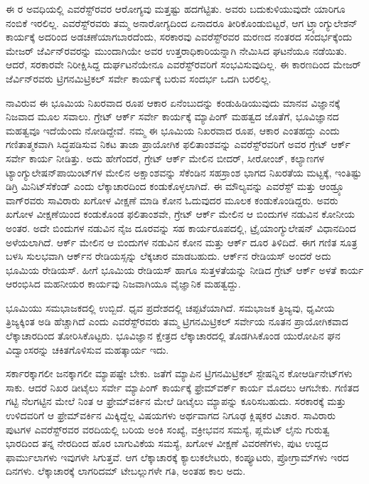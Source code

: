 ಈ ರ ಅವಧಿಯಲ್ಲಿ ಎವರೆಸ್ಟ್​ರವರ ಆರೋಗ್ಯವು ಮತ್ತಷ್ಟು ಹದಗೆಟ್ಟಿತು. ಅವರು ಬದುಕುಳಿಯುವುದೇ ಯಾರಿಗೂ ನಂಬಿಕೆ ಇರಲಿಲ್ಲ. ಎವರೆಸ್ಟ್​ರವರು ತಮ್ಮ ಅನಾರೋಗ್ಯದಿಂದ ಏನಾದರೂ ತೀರಿಕೊಂಡುಬಿಟ್ಟರೆ, ಆಗ ಟ್ರ್ಯಾಂಗ್ಯುಲೇಶನ್​ ಕಾರ್ಯಕ್ಕೆ ಅದರಿಂದ ಅಡಚಣೆಯಾಗಬಾರದೆಂದು, ಸರಕಾರವು ಎವರೆಸ್ಟ್​ರವರ ಮರಣದ ನಂತರದ ಸಂದರ್ಭಕ್ಕೆಂದು ಮೇಜರ್​ ಜೆರ್ವಿನ್​ರವರನ್ನು ಮುಂದಾಗಿಯೇ ಅವರ ಉತ್ತರಾಧಿಕಾರಿಯನ್ನಾಗಿ ನೇಮಿಸಿದ ಘಟನೆಯೂ ನಡೆಯಿತು. ಆದರೆ, ಸರಕಾರವೇ ನಿರೀಕ್ಷಿಸಿದ್ದ ದುರ್ಘಟನೆಯೇನೂ ಎವರೆಸ್ಟ್​\break ರವರಿಗೆ ಸಂಭವಿಸುವುದಿಲ್ಲ. ಈ ಕಾರಣದಿಂದ ಮೇಜರ್​ ಜೆರ್ವಿನ್​ರವರು ಟ್ರಿಗನಮಿಟ್ರಿಕಲ್​ ಸರ್ವೇ ಕಾರ್ಯಕ್ಕೆ ಬರುವ ಸಂದರ್ಭ ಒದಗಿ ಬರಲಿಲ್ಲ.

ನಾವಿರುವ ಈ ಭೂಮಿಯ ನಿಖರವಾದ ರೂಪ ಆಕಾರ ಏನೆಂಬುದನ್ನು ಕಂಡುಹಿಡಿಯುವುದು ಮಾನವ ವಿಜ್ಞಾನಕ್ಕೆ ನಿಜವಾದ ಮೂಲ ಸವಾಲು. ಗ್ರೇಟ್​ ಆರ್ಕ್ ಸರ್ವೇ ಕಾರ್ಯಕ್ಕೆ ಮ್ಯಾಪಿಂಗ್​ ಮಹತ್ವದ ಜೊತೆಗೆ, ಭೂವಿಜ್ಞಾನದ ಮಹತ್ವವೂ ಇದೆಯೆಂದು ನೋಡಿದ್ದೇವೆ. ನಮ್ಮ ಈ ಭೂಮಿಯ ನಿಖರವಾದ ರೂಪ, ಆಕಾರ ಎಂತಹದ್ದು ಎಂದು ಗಣಿತಾತ್ಮಕವಾಗಿ ಸಿದ್ಧಪಡಿಸುವ ನಿಕಟ ತಾಜಾ ಪ್ರಾಯೋಗಿಕ ಫಲಿತಾಂಶವನ್ನು ಎವರೆಸ್ಟ್​ರವರಿಗೆ ಅವರ ಗ್ರೇಟ್​ ಆರ್ಕ್ ಸರ್ವೇ ಕಾರ್ಯ ನೀಡಿತ್ತು. ಅದು ಹೇಗೆಂದರೆ, ಗ್ರೇಟ್​ ಆರ್ಕ್ ಮೇಲಿನ ಬೀದರ್​, ಸೀರೋಂಜ್​, ಕಲ್ಯಾಣಗಳ ಟ್ಯಾಂಗ್ಯುಲೇಷನ್​ ಪಾಯಿಂಟ್​ಗಳ ಮೇಲಿನ ಅಕ್ಷಾಂಶವನ್ನು ಸೆಕೆಂಡಿನ ಸಹಸ್ರಾಂಶ ಭಾಗದ ನಿಖರತೆಯ ಮಟ್ಟಕ್ಕೆ, ಇಂತಿಷ್ಟು ಡಿಗ್ರಿ ಮಿನಿಟ್​ ಸೆಕೆಂಡ್​ ಎಂದು ಲೆಕ್ಕಾಚಾರದಿಂದ ಕಂಡುಕೊಳ್ಳಲಾಗಿದೆ. ಈ ಮೌಲ್ಯವನ್ನು ಎವರೆಸ್ಟ್​ ಮತ್ತು ಆಂಡ್ರ್ಯೂ ವಾಗ್​ರವರು ಸಾವಿರಾರು ಖಗೋಳ ವೀಕ್ಷಣೆ ಮಾಡಿ ಕೋನ ಓದುವುದರ ಮೂಲಕ ಕಂಡುಕೊಂಡಿದ್ದರು. ಅವರು ಖಗೋಳ ವೀಕ್ಷಣೆಯಿಂದ ಕಂಡುಕೊಂಡ ಫಲಿತಾಂಶವೇ, ಗ್ರೇಟ್​ ಆರ್ಕ್ ಮೇಲಿನ ಆ ಬಿಂದುಗಳ ನಡುವಿನ ಕೋನೀಯ ಅಂತರ. ಅದೇ ಬಿಂದುಗಳ ನಡುವಿನ ನೈಜ ದೂರವನ್ನು ಸಹ ಕಾರ್ಯರೂಪದಲ್ಲಿ, ಟ್ರೈಯಾಂಗ್ಯುಲೇಷನ್​ ವಿಧಾನದಿಂದ ಅಳೆಯಲಾಗಿದೆ. ಆರ್ಕ್ ಮೇಲಿನ ಆ ಬಿಂದುಗಳ ನಡುವಿನ ಕೋನ ಮತ್ತು ಆರ್ಕ್ ದೂರ ತಿಳಿದಿದೆ. ಈಗ ಗಣಿತ ಸೂತ್ರ ಬಳಸಿ ಸುಲಭವಾಗಿ ಆರ್ಕ್‌ನ ರೇಡಿಯಸ್ಸನ್ನು ಲೆಕ್ಕಚಾರ ಮಾಡಬಹುದು. ಆರ್ಕ್‌ನ ರೇಡಿಯಸ್​ ಅಂದರೆ ಅದು ಭೂಮಿಯ ರೇಡಿಯಸ್​. ಹೀಗೆ ಭೂಮಿಯ ರೇಡಿಯಸ್​ ಹಾಗೂ ಸುತ್ತಳತೆಯನ್ನು ನೀಡಿದ ಗ್ರೇಟ್​ ಆರ್ಕ್ ಅಳತೆ ಕಾರ್ಯ ಆರಂಭಿಸಿದ ಮಹನೀಯರ ಕಾರ್ಯವು ನಿಜವಾಗಿಯೂ ವೈಜ್ಞಾನಿಕ ಮಹತ್ವದ್ದು.

ಭೂಮಿಯು ಸಮಭಾಜಕದಲ್ಲಿ ಉಬ್ಬಿದೆ. ಧೃವ ಪ್ರದೇಶದಲ್ಲಿ ಚಪ್ಪಟೆಯಾಗಿದೆ. ಸಮಭಾಜಕ ತ್ರಿಜ್ಯವು, ಧೃವೀಯ ತ್ರಿಜ್ಯಕ್ಕಿಂತ  ಅಡಿ ಹೆಚ್ಚಾಗಿದೆ ಎಂದು ಎವರೆಸ್ಟ್​ರವರು ತಮ್ಮ ಟ್ರಿಗನಮಿಟ್ರಿಕಲ್​ ಸರ್ವೇಯ ನೂತನ ಪ್ರಾಯೋಗಿಕವಾದ ಲೆಕ್ಕಾಚಾರದಿಂದ ತೋರಿಸಿಕೊಟ್ಟರು. ಭೂವಿಜ್ಞಾನ ಕ್ಷೇತ್ರದ ಲೆಕ್ಕಾಚಾರದಲ್ಲಿ ತೊಡಗಿಸಿಕೊಂಡ ಯುರೋಪಿನ ಘನ ವಿದ್ವಾಂಸರನ್ನು ಚಕಿತಗೊಳಿಸುವ ಮಹತ್ಕಾರ್ಯ ಇದು.

ಸರ್ಕಾರಕ್ಕಾಗಲೀ ಜನಕ್ಕಾಗಲೀ ಮ್ಯಾಪಷ್ಟೇ ಬೇಕು. ಜತೆಗೆ ಮ್ಯಾಪಿನ ಟ್ರಿಗನಮಿಟ್ರಿಕಲ್​ ಸ್ಟೇಷನ್ನಿನ ಕೋಆರ್ಡಿನೇಟ್​ಗಳು ಸಾಕು. ಆದರೆ ನಿಖರ ಡೀಟೈಲು ಸರ್ವೇ ಮ್ಯಾಪಿಂಗ್​ ಕಾರ್ಯಕ್ಕೆ ಫ್ರೇಮ್‌ವರ್ಕ್ ಕಾರ್ಯ ಮೊದಲು ಆಗಬೇಕು. ಗಣಿತದ ಗಟ್ಟಿ ನೆಲಗಟ್ಟಿನ ಮೇಲೆ ನಿಂತ ಆ ಫ್ರೇಮ್‌ವರ್ಕಿನ ಮೇಲೆ ಡೀಟೈಲು ಮ್ಯಾಪನ್ನು ಕೂರಿಸಬಹುದು. ಸರಕಾರಕ್ಕೆ ಮತ್ತು ಉಳಿದವರಿಗೆ ಆ ಫ್ರೇಮ್‌ವರ್ಕಿನ ಮಿಕ್ಕಿದ್ದೆಲ್ಲ ವಿಷಯಗಳು ಅರ್ಥವಾಗದ ನಿಗೂಢ ಕ್ಲಿಷ್ಠಕರ ವಿಚಾರ. ಸಾವಿರಾರು ಪುಟಗಳ ಎವರೆಸ್ಟ್​ರವರ ವರದಿಯಲ್ಲಿ ಬರಿಯ ಅಂಕಿ ಸಂಖ್ಯೆ, ವಕ್ರೀಭವನ ಸಮಸ್ಯೆ, ಪ್ಲಮೆಟ್​ ಲೈನು ಗುರುತ್ವ ಭಾರದಿಂದ ತನ್ನ ನೇರದಿಂದ ಹೊರ ಬಾಗುವಿಕೆಯ ಸಮಸ್ಯೆ, ಖಗೋಳ ವೀಕ್ಷಣೆ ವಿವರಣೆಗಳು, ಪುಟ ಉದ್ದದ ಫಾರ್ಮುಲಾಗಳು ಇವುಗಳೇ ಸಿಗುತ್ತವೆ. ಆಗ ಲೆಕ್ಕಾಚಾರಕ್ಕೆ ಕ್ಯಾಲುಕಲೇಟರು, ಕಂಪ್ಯೂಟರು, ಪ್ರೋಗ್ರಾಮ್‌ಗಳು ಇರದ ದಿನಗಳು. ಲೆಕ್ಕಾಚಾರಕ್ಕೆ ಲಾಗರಿದಮ್ ಟೇಬಲ್ಲುಗಳೇ ಗತಿ, ಅಂತಹ ಕಾಲ ಅದು.


